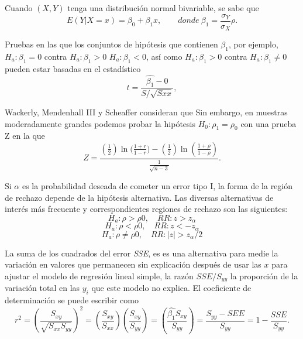\documentclass[12pt,letterpaper]{article}
\begin{document}
Cuando $(X, Y)$ tenga una distribución normal bivariable, se sabe que
\begin{equation}
E(Y|X=x)=\beta_0+\beta_1x,\qquad donde\ \beta_1=\frac{\sigma_Y}{\sigma_X}\rho.
\end{equation}

Pruebas en las que los conjuntos de hipótesis que contienen $\beta_1$, por ejemplo, $H_a\colon \beta_1 = 0$ contra $H_a\colon \beta_1 > 0$ $H_a\colon \beta_1 < 0$, así como $H_a\colon \beta_1 > 0$ contra $H_a\colon \beta_1 \neq 0$ pueden estar basadas en el estadístico
\begin{equation}
t=\frac{\hat{\beta_1}-0}{S/\sqrt{S{xx}}},
\end{equation}

Wackerly, Mendenhall III y Scheaffer consideran que  Sin embargo, en muestras moderadamente grandes podemos probar la hipótesis $H_0\colon \rho_1=\rho_0$ con una prueba Z en la que
\begin{equation}
Z=\frac{(\frac{1}{2})\ln({\frac{1+r}{1-r})}-(\frac{1}{2})\ln(\frac{1+\rho}{1-\rho})}{\frac{1}{\sqrt{n-3}}}.
\end{equation}


Si $\alpha$ es la probabilidad deseada de cometer un error tipo I, la forma de la región de rechazo depende de la hipótesis alternativa. Las diversas alternativas de interés más frecuente y correspondientes regiones de rechazo son las siguientes:
\begin{equation} H_a\colon\rho>\rho0,\quad RR\colon z>z_\alpha \end{equation}
\begin{equation} H_a\colon\rho<\rho0,\quad RR\colon z<-z_\alpha \end{equation}
\begin{equation} H_a\colon\rho\neq\rho0,\quad RR\colon | z | >z_\alpha/2 \end{equation}

La suma de los cuadrados del error \emph{SSE}, es es una alternativa para medie la variación en valores que permanecen sin explicación después de usar las $x$ para ajustar el modelo de regresión lineal simple, la razón $SSE/S_{yy}$ la proporción de la variación total en las $y_i$ que este modelo no explica. El coeficiente de determinación se puede escribir como
\begin{equation}
r^2=(\frac{S_{xy}}{\sqrt{S_{xx}S_{yy}}})^2=(\frac{S_{xy}}{S_{xx}})(\frac{S_{xy}}{S_{yy}})=(\frac{\hat{\beta_1}S_{xy}}{S_{yy}})=\frac{S_{yy}-SEE}{S_{yy}}=1-\frac{SSE}{S_{yy}}.
\end{equation}
\end{document}
